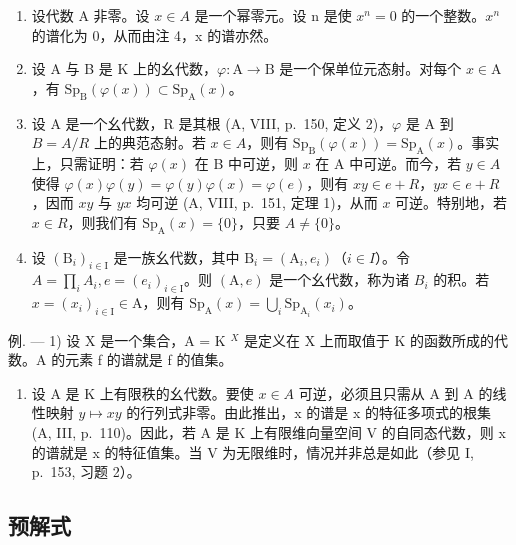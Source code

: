 \begin{enumerate}
\def\labelenumi{\arabic{enumi})}
\setcounter{enumi}{4}
\item
  设代数 A 非零。设 \(x \in A\) 是一个幂零元。设 n 是使 \(x^{n} = 0\) 的一个整数。\(x^{n}\) 的谱化为 0，从而由注 4，x 的谱亦然。
\item
  设 A 与 B 是 K 上的幺代数，\(\varphi\colon\mathrm{A}\to\mathrm{B}\) 是一个保单位元态射。对每个 \(x\in\mathrm{A}\)，有 \(\mathrm{Sp}_{\mathrm{B}}(\varphi(x))\subset\mathrm{Sp}_{\mathrm{A}}(x)\)。
\item
  设 A 是一个幺代数，R 是其根 (A, VIII, p.~150, 定义 2)，\(\varphi\) 是 A 到 \(B = A/R\) 上的典范态射。若 \(x \in A\)，则有 \(\mathrm{Sp}_{\mathrm{B}}(\varphi(x)) = \mathrm{Sp}_{\mathrm{A}}(x)\)。事实上，只需证明：若 \(\varphi(x)\) 在 B 中可逆，则 \(x\) 在 A 中可逆。而今，若 \(y \in A\) 使得 \(\varphi(x)\varphi(y) = \varphi(y)\varphi(x) = \varphi(e)\)，则有 \(xy \in e + R\)，\(yx \in e + R\)，因而 \(xy\) 与 \(yx\) 均可逆 (A, VIII, p.~151, 定理 1)，从而 \(x\) 可逆。特别地，若 \(x \in R\)，则我们有 \(\mathrm{Sp}_{\mathrm{A}}(x) = \{0\}\)，只要 \(A \neq \{0\}\)。
\item
  设 \((\mathrm{B}_{i})_{i\in\mathrm{I}}\) 是一族幺代数，其中 \(\mathrm{B}_{i}=(\mathrm{A}_{i},e_{i})\)（\(i\in I\)）。令 \(A=\prod_{i}A_{i}, e=(e_{i})_{i\in\mathrm{I}}\)。则 \((\mathrm{A},e)\) 是一个幺代数，称为诸 \(B_{i}\) 的积。若 \(x=(x_{i})_{i\in\mathrm{I}}\in\mathrm{A}\)，则有 \(\mathrm{Sp}_{\mathrm{A}}(x)=\bigcup_{i}\mathrm{Sp}_{\mathrm{A}_{i}}(x_{i})\)。
\end{enumerate}

例. --- 1) 设 X 是一个集合，A = K \(^{X}\) 是定义在 X 上而取值于 K 的函数所成的代数。A 的元素 f 的谱就是 f 的值集。

\begin{enumerate}
\def\labelenumi{\arabic{enumi})}
\setcounter{enumi}{1}
\tightlist
\item
  设 A 是 K 上有限秩的幺代数。要使 \(x \in A\) 可逆，必须且只需从 A 到 A 的线性映射 \(y \mapsto xy\) 的行列式非零。由此推出，x 的谱是 x 的特征多项式的根集 (A, III, p.~110)。因此，若 A 是 K 上有限维向量空间 V 的自同态代数，则 x 的谱就是 x 的特征值集。当 V 为无限维时，情况并非总是如此（参见 I, p.~153, 习题 2）。
\end{enumerate}

\subsection{预解式}

